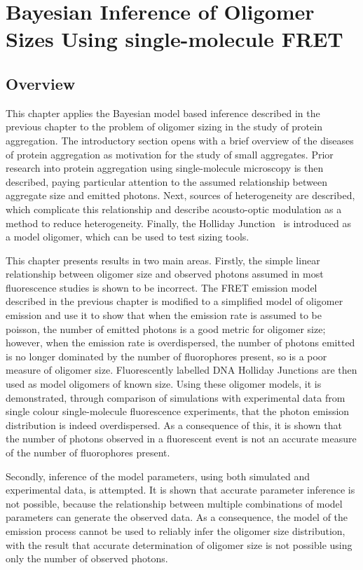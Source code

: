 \chapter{Bayesian Inference of Oligomer Sizes Using single-molecule FRET}
\label{chap:sizing}

\section{Overview}
This chapter applies the Bayesian model based inference described in the previous chapter to the problem of oligomer sizing in the study of protein aggregation. The introductory section opens with a brief overview of the diseases of protein aggregation as motivation for the study of small aggregates. Prior research into protein aggregation using single-molecule microscopy is then described, paying particular attention to the assumed relationship between aggregate size and emitted photons. Next, sources of heterogeneity are described, which complicate this relationship and describe acousto-optic modulation as a method to reduce heterogeneity. Finally, the Holliday Junction~\cite{holliday1964} is introduced as a model oligomer, which can be used to test sizing tools.

This chapter presents results in two main areas. Firstly, the simple linear relationship between oligomer size and observed photons assumed in most fluorescence studies is shown to be incorrect. The FRET emission model described in the previous chapter is modified to a simplified model of oligomer emission and use it to show that when the emission rate is assumed to be poisson, the number of emitted photons is a good metric for oligomer size; however, when the emission rate is overdispersed, the number of photons emitted is no longer dominated by the number of fluorophores present, so is a poor measure of oligomer size. Fluorescently labelled DNA Holliday Junctions are then used as model oligomers of known size. Using these oligomer models, it is demonstrated, through comparison of simulations with experimental data from single colour single-molecule fluorescence experiments, that the photon emission distribution is indeed overdispersed. As a consequence of this, it is shown that the number of photons observed in a fluorescent event is not an accurate measure of the number of fluorophores present. 

Secondly, inference of the model parameters, using both simulated and experimental data, is attempted. It is shown that accurate parameter inference is not possible, because the relationship between multiple combinations of model parameters can generate the observed data. As a consequence, the model of the emission process cannot be used to reliably infer the oligomer size distribution, with the result that accurate determination of oligomer size is not possible using only the number of observed photons.

